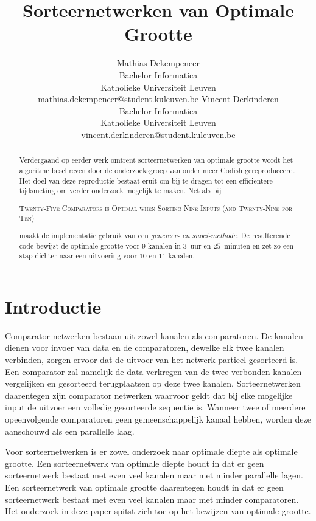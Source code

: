 \documentclass{article}
\title{Sorteernetwerken van Optimale Grootte}%
\author{Mathias Dekempeneer\\Bachelor Informatica\\Katholieke Universiteit Leuven \\mathias.dekempeneer@student.kuleuven.be
\And
Vincent Derkinderen\\Bachelor Informatica\\Katholieke Universiteit Leuven \\vincent.derkinderen@student.kuleuven.be}
\begin{document}
\maketitle

\begin{abstract}
Verdergaand op eerder werk omtrent sorteernetwerken van optimale grootte wordt het algoritme beschreven door de onderzoeksgroep van onder meer Codish gereproduceerd\cite{sortingNetworksSize2014}.
Het doel van deze reproductie bestaat eruit om bij te dragen tot een effici\"entere tijdsmeting om verder onderzoek mogelijk te maken.
Net als bij
\begin{small}
\textsc{Twenty-Five Comparators is Optimal when Sorting Nine Inputs (and Twenty-Nine for Ten)}
\end{small}
maakt de implementatie gebruik van een \textit{genereer- en snoei-methode}.
De resulterende code bewijst de optimale grootte voor $9$ kanalen in $3$~uur en $25$~minuten en zet zo een stap dichter naar een uitvoering voor $10$ en $11$ kanalen.
\end{abstract}

\section{Introductie}
Comparator netwerken bestaan uit zowel kanalen als comparatoren.
De kanalen dienen voor invoer van data en de comparatoren, dewelke elk twee kanalen verbinden, zorgen ervoor dat de uitvoer van het netwerk partieel gesorteerd is.
Een comparator zal namelijk de data verkregen van de twee verbonden kanalen vergelijken en gesorteerd terugplaatsen op deze twee kanalen.
Sorteernetwerken daarentegen zijn comparator netwerken waarvoor geldt dat bij elke mogelijke input de uitvoer een volledig gesorteerde sequentie is.
Wanneer twee of meerdere opeenvolgende comparatoren geen gemeenschappelijk kanaal hebben, worden deze aanschouwd als een parallelle laag. 

Voor sorteernetwerken is er zowel onderzoek naar optimale diepte als optimale grootte.
Een sorteernetwerk van optimale diepte houdt in dat er geen sorteernetwerk bestaat met even veel kanalen maar met minder parallelle lagen.
Een sorteernetwerk van optimale grootte daarentegen houdt in dat er geen sorteernetwerk bestaat met even veel kanalen maar met minder comparatoren.
Het onderzoek in deze paper spitst zich toe op het bewijzen van optimale grootte.
\end{document}
